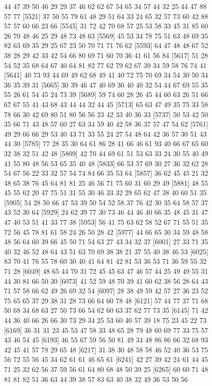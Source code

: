 \documentclass{article}
\begin{document}
\begin{figure}[H]
\begin{Schunk}
\begin{Soutput}
 [5497] 44 47 39 50 46 29 29 37 46 62 62 67 54 65 34 57 44 32 25 44 47 88 57 77
 [5521] 37 50 55 79 61 48 29 51 64 33 24 65 32 57 73 60 42 88 57 57 60 66 23 66
 [5545] 31 72 42 70 68 57 25 53 58 33 45 31 85 60 26 70 48 46 25 29 48 73 48 63
 [5569] 45 53 34 78 75 51 63 48 69 35 82 63 69 35 29 25 67 23 50 70 71 71 76 62
 [5593] 64 47 48 48 67 52 38 28 29 42 33 42 54 66 80 69 71 60 70 36 41 61 56 84
 [5617] 51 28 54 52 35 68 64 67 40 64 81 82 77 62 79 62 67 39 34 59 58 76 74 41
 [5641] 40 73 93 44 69 49 62 68 49 41 40 72 75 70 69 34 54 30 50 34 36 35 39 31
 [5665] 30 39 46 47 40 69 30 40 40 32 54 44 67 69 55 35 55 26 61 54 45 24 73 39
 [5689] 59 74 60 28 26 45 44 60 63 26 51 66 67 67 55 41 43 68 43 44 44 32 44 45
 [5713] 65 63 47 49 35 75 33 58 78 66 30 42 69 80 51 80 56 56 23 42 33 40 36 33
 [5737] 50 53 42 50 35 66 71 43 48 57 60 27 63 34 59 40 42 58 36 37 57 47 54 62
 [5761] 49 29 66 66 29 53 40 43 71 33 55 24 27 54 48 64 42 36 57 30 51 43 44 30
 [5785] 77 28 35 30 64 61 86 28 41 66 46 61 93 40 66 67 65 60 32 38 32 51 42 48
 [5809] 42 70 44 69 61 51 53 63 33 24 30 55 40 49 41 55 80 48 56 53 65 35 40 48
 [5833] 66 53 57 69 30 27 36 32 62 28 54 67 56 22 33 32 57 54 74 84 66 35 53 64
 [5857] 36 62 45 45 21 32 48 65 38 76 45 64 81 81 25 46 56 71 75 60 31 60 29 49
 [5881] 48 55 45 55 62 20 47 75 51 31 55 30 46 33 32 29 65 62 47 38 40 60 51 35
 [5905] 54 28 50 66 47 53 39 50 54 52 58 37 76 42 30 35 64 58 57 37 43 52 30 64
 [5929] 24 62 39 77 30 73 46 44 46 40 66 35 48 45 31 47 47 40 53 51 41 33 77 38
 [5953] 56 41 75 63 62 58 52 67 71 55 51 35 72 56 45 78 81 61 58 24 26 50 28 42
 [5977] 44 66 65 30 34 59 48 58 48 56 64 60 39 66 45 50 71 54 63 27 43 34 32 37
 [6001] 27 33 71 35 40 32 46 52 48 64 43 51 63 70 69 38 38 21 37 55 40 38 46 53
 [6025] 83 70 41 76 55 78 60 30 40 41 64 81 42 81 53 36 53 71 36 59 55 32 71 28
 [6049] 48 65 44 70 31 72 45 45 63 47 46 57 44 25 49 49 55 31 44 30 81 66 50 30
 [6073] 41 52 59 48 70 39 41 60 62 38 56 28 64 43 71 57 58 66 62 49 26 69 32 54
 [6097] 28 38 49 59 42 57 27 36 23 52 75 65 65 37 29 38 31 28 73 66 64 60 78 48
 [6121] 57 44 77 37 71 68 50 68 34 68 63 27 50 73 66 54 62 60 63 37 62 77 73 35
 [6145] 71 42 44 36 40 66 26 66 30 73 29 34 25 53 60 40 57 39 18 75 23 45 22 73
 [6169] 36 31 31 23 45 53 47 58 33 48 65 28 79 48 60 69 77 33 75 57 43 46 54 45
 [6193] 46 55 67 59 56 50 81 49 34 48 86 86 66 32 68 93 42 45 41 57 78 29 65 48
 [6217] 31 38 30 48 58 58 46 52 40 36 53 75 56 72 55 56 45 34 62 61 61 46 65 61
 [6241] 42 27 39 42 24 61 44 45 71 25 32 62 56 37 59 56 61 64 80 68 48 50 39 25
 [6265] 60 60 71 48 81 81 82 51 36 63 44 39 38 57 83 63 40 38 32 49 36 53 50 56

\end{Soutput}
\end{Schunk}
\end{figure}
\end{document}
